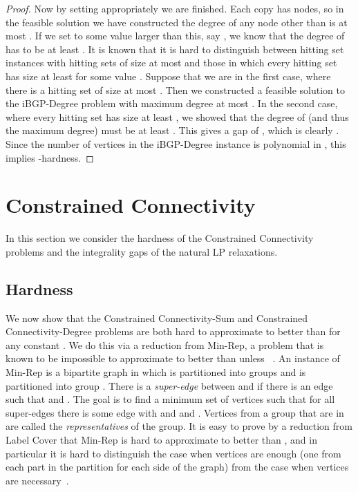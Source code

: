 \documentclass[11pt,letterpaper]{article}
\theoremstyle{definition}
\begin{document}
\begin{proof}
  Now by setting  appropriately we are finished.  Each copy
  has  nodes, so in the feasible solution we have constructed
  the degree of any node other than  is at most .
  If we set  to some value larger than this, say ,
  we know that the degree of  has to be at least .
  It is known that it is hard to distinguish between hitting set
  instances with hitting sets of size at most  and
  those in which every hitting set has size at least  for
  some value .  Suppose that we are in the first case, where
  there is a hitting set of size at most .  Then we constructed
  a feasible solution to the {\sc iBGP-Degree} problem with maximum
  degree at most .  In the second case, where
  every hitting set has size at least , we showed that
  the degree of  (and thus the maximum degree) must be at least
  .  This gives a gap of , which is clearly .  Since the number of
  vertices in the {\sc iBGP-Degree} instance is polynomial in ,
  this implies -hardness.
  \end{proof}





\section{Constrained Connectivity} \label{sec:CC}
In this section we consider the hardness of the Constrained Connectivity problems and the integrality gaps of the natural LP relaxations.

\subsection{Hardness}
We now show that the {\sc Constrained Connectivity-Sum} and {\sc
  Constrained Connectivity-Degree} problems are both hard to approximate to better than
 for any constant .  We do this via a reduction from {\sc
  Min-Rep}, a problem that is known to be impossible to approximate to
better than  unless ~\cite{Kortsarz:99}. An instance of {\sc
  Min-Rep} is a bipartite graph  in which  is
partitioned into groups  and  is partitioned
into group .  There is a \emph{super-edge}
between  and  if there is an edge  such that
 and .  The goal is to find a minimum set  of
vertices such that for all super-edges  there is some
edge  with  and  and .  Vertices from a group that are in  are called the \emph{representatives} of the group.
It is easy to prove by a reduction from {\sc Label Cover} that {\sc
  Min-Rep} is hard to approximate to better than , and in particular it is hard to distinguish the case when 
vertices are enough (one from each part in the partition for each side
of the graph) from the case when 
vertices are necessary~\cite{Kortsarz:99}.
\end{document}
